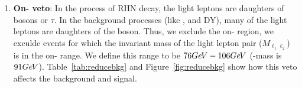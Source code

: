 \documentclass[letterpaper,12pt]{article}
\newcommand{\GeV}{{Ge\kern -0.1em V}}
\begin{document}
\begin{enumerate}
  \item \textbf{On-\boldmath{\Zboson} veto}: In the process of RHN decay, the light leptons are daughters of \Wboson{} bosons or $\tau$. In the background processes (like \ZZ, \WZ{} and DY), many of the light leptons are daughters of the \Zboson{} boson. Thus, we exclude the on-\Zboson{} region, \ie{} we exculde events for which the invariant mass of the light lepton pair ($M_{\ell_{1}\ell_{2}}$) is in the on-\Zboson{} range. We define this range to be $76\GeV - 106\GeV$ (\Zboson-mass is $91\GeV$). Table~\ref{tab:reducebkg} and Figure~\ref{fig:reducebkg} show how this veto affects the background and signal.

\begin{table}[h]
  \centering
  \footnotesize
  \setlength{\tabcolsep}{20pt}
  \renewcommand{\arraystretch}{1.6}
  \caption{The number of events before and after applying the On-\Zboson{} veto. The signal also reduces with the background but the overall significance immproves in every region.}
  \label{tab:reducebkg}
\end{table}


\end{enumerate}
\end{document}
